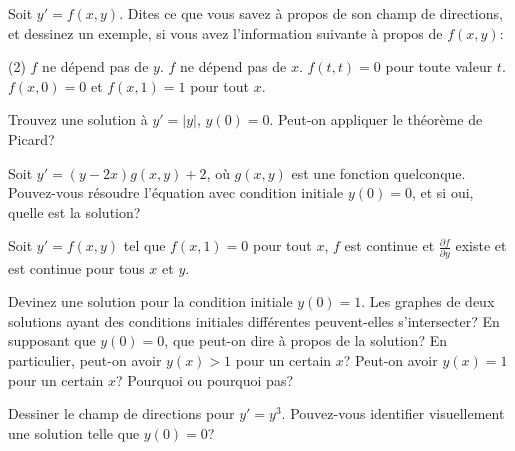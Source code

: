\begin{exercise}
Soit $y' = f(x,y)$.  Dites ce que vous savez à propos de son champ de directions, et dessinez un exemple, si vous avez l'information suivante à propos de  $f(x,y)$:
\begin{tasks}(2)
\task $f$ ne dépend pas de $y$.
\task $f$ ne dépend pas de $x$.
\task $f(t,t) = 0$ pour toute valeur $t$.
\task $f(x,0) = 0$ et $f(x,1) = 1$ pour tout $x$.
\end{tasks}
\end{exercise}

\begin{exercise}
Trouvez une solution à $y' = \lvert y \rvert$, $y(0) = 0$.  Peut-on appliquer le théorème de Picard?
\end{exercise}

\begin{exercise}
Soit $y' = (y-2x) g(x,y) + 2$, où $g(x,y)$ est une fonction quelconque.
Pouvez-vous résoudre l'équation avec condition initiale $y(0) = 0$,
et si oui, quelle est la solution?
\end{exercise}

\begin{exercise}[défi]
\pagebreak[2]
Soit $y' = f(x,y)$ tel que $f(x,1) = 0$ pour tout $x$,
$f$ est continue et $\frac{\partial f}{\partial y}$ existe et est continue pour tous $x$ et $y$.
\begin{tasks}
\task
Devinez une solution pour la condition initiale
$y(0) = 1$.
\task
Les graphes de deux solutions ayant des conditions initiales différentes peuvent-elles s'intersecter?
\task
En supposant que $y(0) = 0$, que peut-on dire à propos de la solution?  En particulier, peut-on avoir $y(x) > 1$ pour un certain $x$?  Peut-on avoir $y(x) = 1$ pour un certain  $x$?  Pourquoi ou pourquoi pas?
\end{tasks}
\end{exercise}

\setcounter{exercise}{100}

\begin{exercise}
Dessiner le champ de directions pour $y'=y^3$.  Pouvez-vous identifier visuellement une solution telle que $y(0)=0$?
\end{exercise}

